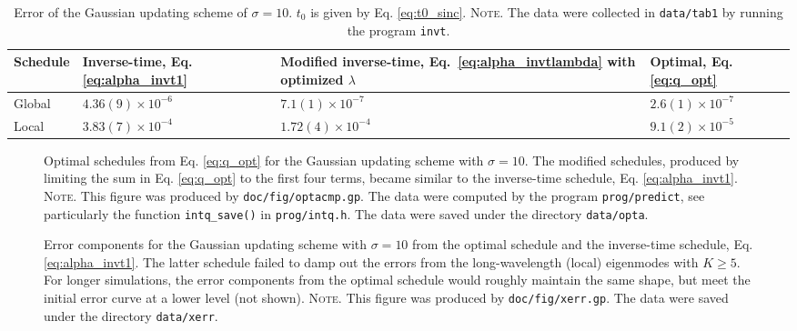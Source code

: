 \documentclass[reprint, floatfix]{revtex4-1}
\newcommand{\note}[1]{{\color{DarkGreen}\footnotesize \textsc{Note.} #1}}
\begin{document}
\begin{table}[h]
  \caption{\label{tab:error_Gaussian}
    Error of the Gaussian updating scheme of $\sigma = 10$.
    $t_0$ is given by Eq. \eqref{eq:t0_sinc}.
    \note{
      The data were collected in
      \texttt{data/tab1} by running
      the program \texttt{invt}.
    }%
  }
  \setlength{\tabcolsep}{5pt}
  \begin{tabular} { l | p{2cm} p{2.5cm} p{1.8cm} }
    \hline
      Schedule
    &
      Inverse-time, Eq. \eqref{eq:alpha_invt1}
    &
      Modified inverse-time,
      Eq.~\eqref{eq:alpha_invtlambda}
      with optimized $\lambda$
    &
      Optimal,
      Eq. \eqref{eq:q_opt}
    \\
    \hline
    Global
    &
    $4.36(9) \times 10^{-6}$
    &
    $7.1(1) \times 10^{-7}$
    &
    $2.6(1) \times 10^{-7}$
    \\
    \hline
    Local
    &
    $3.83(7) \times 10^{-4}$
    &
    $1.72(4) \times 10^{-4}$
    &
    $9.1(2) \times 10^{-5}$
    \\
    \hline
  \end{tabular}
\end{table}


\begin{figure}[h]
\begin{center}
  \caption{
    \label{fig:optacmp}
    Optimal schedules from Eq. \eqref{eq:q_opt}
    for the Gaussian updating scheme
    with $\sigma = 10$.
    The modified schedules, produced by
    limiting the sum in Eq. \eqref{eq:q_opt}
    to the first four terms,
    became similar to the inverse-time schedule,
    Eq. \eqref{eq:alpha_invt1}.
    \note{This figure was produced by \texttt{doc/fig/optacmp.gp}.
      The data were computed by the program \texttt{prog/predict},
      see particularly the function \texttt{intq\_save()}
      in \texttt{prog/intq.h}.
      The data were saved under the directory \texttt{data/opta}.
    }%
  }
\end{center}
\end{figure}


\begin{figure}[h]
\begin{center}
  \caption{
    \label{fig:xerr}
    Error components for the Gaussian updating scheme
    with $\sigma = 10$
    from the optimal schedule
    and the inverse-time schedule, Eq. \eqref{eq:alpha_invt1}.
    The latter schedule failed to damp out the errors
    from the long-wavelength (local) eigenmodes
    with $K \ge 5$.
    For longer simulations,
    the error components from the optimal schedule
    would roughly maintain the same shape,
    but meet the initial error curve
    at a lower level (not shown).
    \note{This figure was produced by \texttt{doc/fig/xerr.gp}.
      The data were saved under the directory \texttt{data/xerr}.
    }%
  }
\end{center}
\end{figure}
\end{document}
